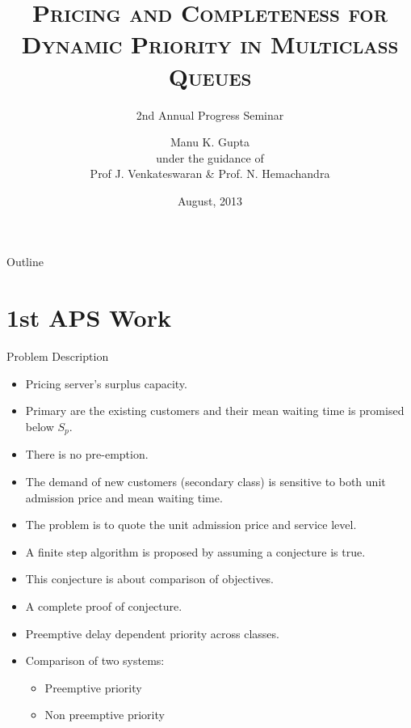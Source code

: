 \documentclass[compress, serif, onlymath, professionalfonts]{beamer}
\title[Pricing and Completeness for Dynamic Priority]{\textsc{Pricing and Completeness for Dynamic Priority in Multiclass Queues}}
\subtitle{2nd Annual Progress Seminar}
\author[Manu K. Gupta]{\large{Manu K. Gupta} \\  [0.5cm] \small{under the guidance of \\ Prof J. Venkateswaran \& Prof. N. Hemachandra}}
\institute[IEOR@IITB]{Industrial Engineering and Operations Research\\ Indian Institute of Technology Bombay}
\date{August, 2013}
\begin{document}
\begin{frame}
\titlepage
\end{frame}

\begin{frame}{Outline}
\tableofcontents
\end{frame}
\section{1st APS Work}
\begin{frame}{Problem Description}

 \begin{figure}[htb!]
\centering
\vspace{-.25in}
\label{basicmodel}
\end{figure}
\begin{itemize}
	\item Pricing server's surplus capacity.
    \item Primary are the existing customers and their mean waiting time is promised below $S_p$.
	\item There is no pre-emption.
	\item The demand of new customers (secondary class) is
sensitive to both unit admission price and mean waiting time.
   \item The problem is to quote the unit admission price and
service level.
\end{itemize}
\end{frame}
\begin{frame}
\begin{itemize}
\item A finite step algorithm is proposed by \citet{Sudhir_standard_style} assuming a conjecture is true.
\item This conjecture is about comparison of objectives.
\item A complete proof of conjecture. 
\item Preemptive delay dependent priority across classes.
\item Comparison of two systems:
\begin{itemize}
\item Preemptive priority
\item Non preemptive priority
\end{itemize}
\end{itemize}

\end{frame}
\end{document}
